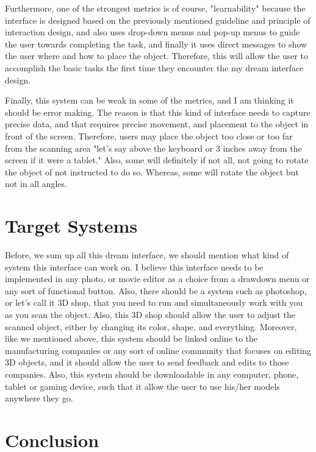 \documentclass[12pt, oneside]{amsart}   	%
\begin{document}
Furthermore, one of the strongest metrics is of course, "learnability" because the interface is designed based on the previously mentioned guideline and principle of interaction design, and also uses drop-down menus and pop-up menus to guide the user towards completing the task, and finally it uses direct messages to show the user where and how to place the object.  Therefore,  this will allow the user to accomplish the basic tasks the first time they encounter the my dream interface design.

Finally, this system can be weak in some of the metrics, and I am thinking it should be error making.  The reason is that this kind of interface needs to capture precise data, and that requires precise movement, and placement to the object in front of the screen.  Therefore, users may place the object too close or too far from the scanning area "let's say above the keyboard or 3 inches away from the screen if it were a tablet."  Also, some will definitely if not all, not going to rotate the object of not instructed to do so. Whereas, some will rotate the object but not in all angles.  

\section{Target Systems}

Before, we sum up all this dream interface, we should mention what kind of system this interface can work on.  I believe this interface needs to be implemented in any photo, or movie editor as a choice from a drawdown menu or any sort of functional button.  Also, there should be a system such as photoshop, or let's call it 3D shop, that you need to run and simultaneously work with you as you scan the object.  Also, this 3D shop should allow the user to adjust the scanned object, either by changing its color, shape, and everything. Moreover, like we mentioned above, this system should be linked online to the manufacturing companies or any sort of online community that focuses on editing 3D objects, and it should allow the user to send feedback and edits to those companies.  Also, this system should be downloadable in any computer, phone, tablet or gaming device, such that it allow the user to use his/her models anywhere they go. 
\section{Conclusion}
\end{document}
